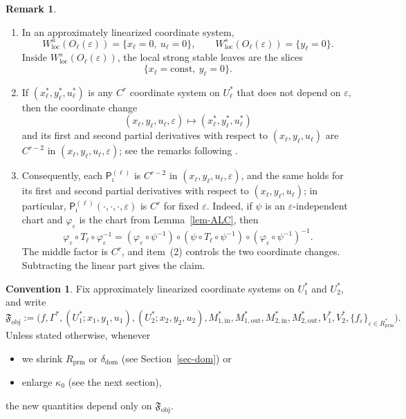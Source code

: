 \documentclass[11pt,a4paper]{article}
\theoremstyle{plain}
\theoremstyle{definition}
\newtheorem{remark}[theorem]{Remark}
\newtheorem{convention}[theorem]{Convention}
\theoremstyle{plain}
\numberwithin{equation}{section}
\begin{document}
\begin{remark}\leavevmode
\label{rem-ALCdetails}
\begin{enumerate}
\item[(1)] In an approximately linearized coordinate system,
\[
W^u_\mathrm{loc}(O_\ell(\varepsilon)) = \{x_\ell = 0,\ u_\ell = 0\},
\qquad
W^s_\mathrm{loc}(O_\ell(\varepsilon)) = \{y_\ell = 0\}.
\]
Inside $W^s_\mathrm{loc}(O_\ell(\varepsilon))$, the local strong stable leaves are the slices
\[
\{x_\ell = \mathrm{const},\ y_\ell = 0\}.
\]
\item[(2)] If $(x_\ell^*,y_\ell^*,u_\ell^*)$ is any $C^r$ coordinate system on $U_\ell^*$ that does not depend on $\varepsilon$, then the coordinate change
\[
(x_\ell,y_\ell,u_\ell,\varepsilon) \longmapsto (x_\ell^*,y_\ell^*,u_\ell^*)
\]
and its first and second partial derivatives with respect to $(x_\ell,y_\ell,u_\ell)$ are $C^{r-2}$ in $(x_\ell,y_\ell,u_\ell,\varepsilon)$; see the remarks following \cite[Lemma~6]{GST2008}.
\item[(3)] Consequently, each $\mathsf{P}_\imath^{(\ell)}$ is $C^{r-2}$ in $(x_\ell,y_\ell,u_\ell,\varepsilon)$, and the same holds for its first and second partial derivatives with respect to $(x_\ell,y_\ell,u_\ell)$; in particular, $\mathsf{P}_\imath^{(\ell)}(\cdot, \cdot, \cdot, \varepsilon)$ is $C^r$ for fixed $\varepsilon$. Indeed, if $\psi$ is an $\varepsilon$-independent chart and $\varphi_\varepsilon$ is the chart from Lemma~\ref{lem-ALC}, then
\[
\varphi_\varepsilon \circ T_\ell \circ \varphi_\varepsilon^{-1}
=
(\varphi_\varepsilon \circ \psi^{-1})
\circ
(\psi \circ T_\ell \circ \psi^{-1})
\circ
(\varphi_\varepsilon \circ \psi^{-1})^{-1}.
\]
The middle factor is $C^r$, and item~(2) controls the two coordinate changes. Subtracting the linear part gives the claim.
\end{enumerate}
\end{remark}

\begin{convention}
Fix approximately linearized coordinate systems on $U_1^*$ and $U_2^*$, and write
\[
\mathfrak{F}_\mathrm{obj}
:=
\bigl(
f,\Gamma^*,(U_1^*;x_1,y_1,u_1),(U_2^*;x_2,y_2,u_2),
M_{1,\mathrm{in}}^*,M_{1,\mathrm{out}}^*,M_{2,\mathrm{in}}^*,M_{2,\mathrm{out}}^*,
V_1^*, V_2^*,
\{f_\varepsilon\}_{\varepsilon \in R_\mathrm{prm}^*}
\bigr).
\]
Unless stated otherwise, whenever
\begin{itemize}
\item we shrink $R_\mathrm{prm}$ or $\delta_\mathrm{dom}$ (see Section~\ref{sec-dom}) or
\item enlarge $\kappa_0$ (see the next section),
\end{itemize}
the new quantities depend only on $\mathfrak{F}_\mathrm{obj}$.
\end{convention}
\end{document}
